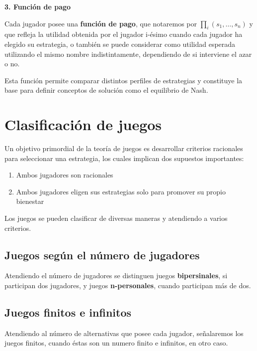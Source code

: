 \documentclass[12pt,a4paper,]{book}
\numberwithin{dummy}{section}
\theoremstyle{ocrenumbox}
\theoremstyle{blacknumex}
\theoremstyle{blacknumbox}
\theoremstyle{ocrenum}
\theoremstyle{ocrenum}
\begin{document}
\textbf{3. Función de pago}

Cada jugador posee una \textbf{función de pago}, que notaremos por
\(\prod_i(s_1, \ldots, s_n)\) y que refleja la utilidad obtenida por el
jugador i-ésimo cuando cada jugador ha elegido su estrategia, o también
se puede considerar como utilidad esperada utilizando el mismo nombre
indistintamente, dependiendo de si interviene el azar o no.

Esta función permite comparar distintos perfiles de estrategias y
constituye la base para definir conceptos de solución como el equilibrio
de Nash.

\section{Clasificación de juegos}\label{clasificaciuxf3n-de-juegos}

Un objetivo primordial de la teoría de juegos es desarrollar criterios
racionales para seleccionar una estrategia, los cuales implican dos
supuestos importantes:

\begin{enumerate}
\def\labelenumi{\arabic{enumi}.}
\item
  Ambos jugadores son racionales
\item
  Ambos jugadores eligen sus estrategias solo para promover su propio
  bienestar
\end{enumerate}

Los juegos se pueden clasificar de diversas maneras y atendiendo a
varios criterios.

\subsection{Juegos según el número de
jugadores}\label{juegos-seguxfan-el-nuxfamero-de-jugadores}

Atendiendo el número de jugadores se distinguen juegos
\textbf{bipersinales}, si participan dos jugadores, y juegos
\textbf{n-personales}, cuando participan más de dos.

\subsection{Juegos finitos e
infinitos}\label{juegos-finitos-e-infinitos}

Atendiendo al número de alternativas que posee cada jugador, señalaremos
los juegos finitos, cuando éstas son un numero finito e infinitos, en
otro caso.
\end{document}
